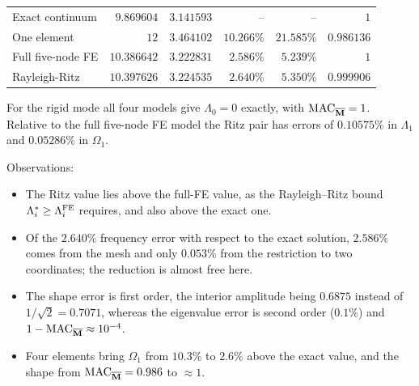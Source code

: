 \documentclass[12pt]{article}
\begin{document}
\begin{enumerate}
\begin{center}
\begin{tabular}{@{}lrrrrr@{}}
                  Exact continuum   & $9.869604$  & $3.141593$ & --               & --                & $1$        \\
                  One element       & $12$        & $3.464102$ & $10.266\%$       & $21.585\%$        & $0.986136$ \\
                  Full five-node FE & $10.386642$ & $3.222831$ & $2.586\%$        & $5.239\%$         & $1$        \\
                  Rayleigh-Ritz     & $10.397626$ & $3.224535$ & $2.640\%$        & $5.350\%$         & $0.999906$ \\
                  \bottomrule
              \end{tabular}
          \end{center}
          For the rigid mode all four models give $\Lambda_0=0$ exactly, with $\mathrm{MAC}_{\overline{\mathbf M}}=1$. Relative to the full five-node FE model the Ritz pair has errors of $0.10575\%$ in $\Lambda_1$ and $0.05286\%$ in $\Omega_1$.

          Observations:
          \begin{itemize}
              \item The Ritz value lies above the full-FE value, as the Rayleigh--Ritz bound $\Lambda^*_i\ge\Lambda^{\rm FE}_i$ requires, and also above the exact one.
              \item Of the $2.640\%$ frequency error with respect to the exact solution, $2.586\%$ comes from the mesh and only $0.053\%$ from the restriction to two coordinates; the reduction is almost free here.
              \item The shape error is first order, the interior amplitude being $0.6875$ instead of $1/\sqrt2=0.7071$, whereas the eigenvalue error is second order ($0.1\%$) and $1-\mathrm{MAC}_{\overline{\mathbf M}}\approx 10^{-4}$.
              \item Four elements bring $\Omega_1$ from $10.3\%$ to $2.6\%$ above the exact value, and the shape from $\mathrm{MAC}_{\overline{\mathbf M}}=0.986$ to $\approx1$.
          \end{itemize}


\end{enumerate}
\end{document}
